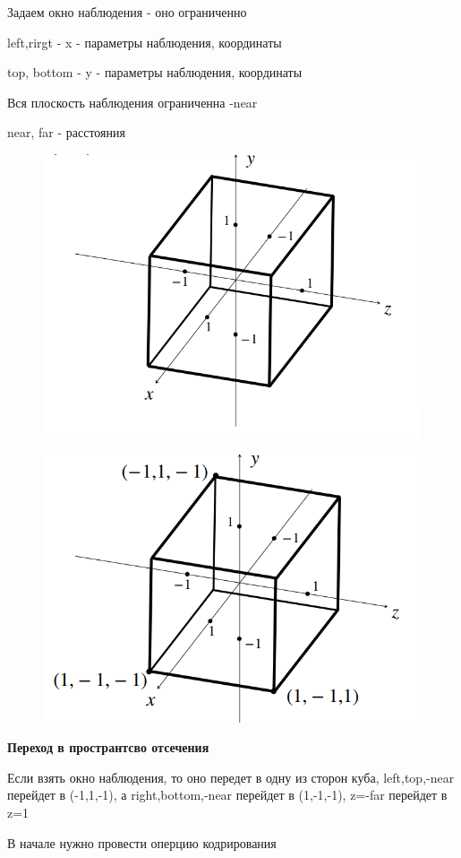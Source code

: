 \documentclass{article}
\begin{document}
Задаем окно наблюдения - оно ограниченно 

left,rirgt - x - параметры наблюдения, координаты

top, bottom - y - параметры наблюдения, координаты

Вся плоскость наблюдения ограниченна -near

near, far - расстояния

\begin{figure} [H]
    \includegraphics[width=0.70\linewidth]{Снимок экрана 2025-04-07 122342.png}
\end{figure}


\begin{figure} [H]
    \includegraphics[width=0.70\linewidth]{Снимок экрана 2025-04-07 122403.png}
\end{figure}

\textbf{Переход в пространтсво отсечения}

Если взять окно наблюдения, то оно передет в одну из сторон куба, 
left,top,-near перейдет в (-1,1,-1), а
right,bottom,-near перейдет в (1,-1,-1),
z=-far перейдет в z=1

\vspace{1cm}

В начале нужно провести оперцию кодрирования
\end{document}
